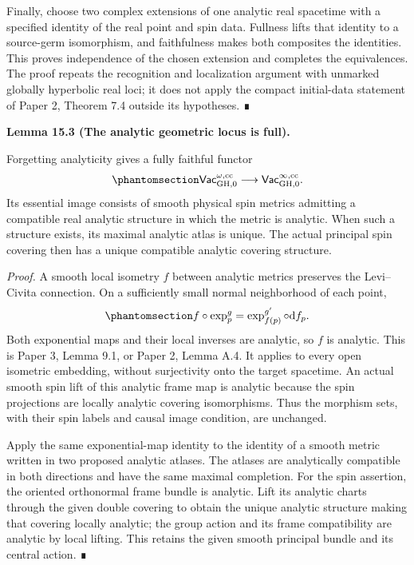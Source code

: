 \documentclass[
  english,
  11pt,
  reqno]{amsart}
\makeatletter
\newcommand{\pandocstatementheading}[1]{%
  \par\if@nobreak\else
    \addpenalty{\@beginparpenalty}%
    \addvspace{.5\baselineskip plus .2\baselineskip minus .2\baselineskip}%
  \fi
  {\normalfont\bfseries #1\par}%
  \nobreak\@afterindenttrue\@afterheading
}
\makeatother
\begin{document}
Finally, choose two complex extensions of one analytic real spacetime
with a specified identity of the real point and spin data. Fullness
lifts that identity to a source-germ isomorphism, and faithfulness makes
both composites the identities. This proves independence of the chosen
extension and completes the equivalences. The proof repeats the
recognition and localization argument with unmarked globally hyperbolic
real loci; it does not apply the compact initial-data statement of Paper
2, Theorem 7.4 outside its hypotheses. ∎

\pandocstatementheading{\protect{}\label{lem:analytic-geometric-locus-fullness}Lemma 15.3 (The analytic geometric locus is full).}

Forgetting analyticity gives a fully faithful functor
\begin{equation}\protect\phantomsection\label{eq:analytic-geometric-locus-inclusion}{
\mathsf{Vac}^{\omega,\mathrm{cc}}_{\mathrm{GH},0}
\longrightarrow
\mathsf{Vac}^{\infty,\mathrm{cc}}_{\mathrm{GH},0}.
}\end{equation} Its essential image consists of smooth physical spin
metrics admitting a compatible real analytic structure in which the
metric is analytic. When such a structure exists, its maximal analytic
atlas is unique. The actual principal spin covering then has a unique
compatible analytic covering structure.

\emph{Proof.} A smooth local isometry \(f\) between analytic metrics
preserves the Levi--Civita connection. On a sufficiently small normal
neighborhood of each point,
\begin{equation}\protect\phantomsection\label{eq:analytic-embedding-normal-coordinate-proof}{
f\circ\exp_p^{g}
=\exp_{f(p)}^{g'}\circ\mathrm df_p.
}\end{equation} Both exponential maps and their local inverses are
analytic, so \(f\) is analytic. This is Paper 3, Lemma 9.1, or Paper 2,
Lemma A.4. It applies to every open isometric embedding, without
surjectivity onto the target spacetime. An actual smooth spin lift of
this analytic frame map is analytic because the spin projections are
locally analytic covering isomorphisms. Thus the morphism sets, with
their spin labels and causal image condition, are unchanged.

Apply the same exponential-map identity to the identity of a smooth
metric written in two proposed analytic atlases. The atlases are
analytically compatible in both directions and have the same maximal
completion. For the spin assertion, the oriented orthonormal frame
bundle is analytic. Lift its analytic charts through the given double
covering to obtain the unique analytic structure making that covering
locally analytic; the group action and its frame compatibility are
analytic by local lifting. This retains the given smooth principal
bundle and its central action. ∎
\end{document}

